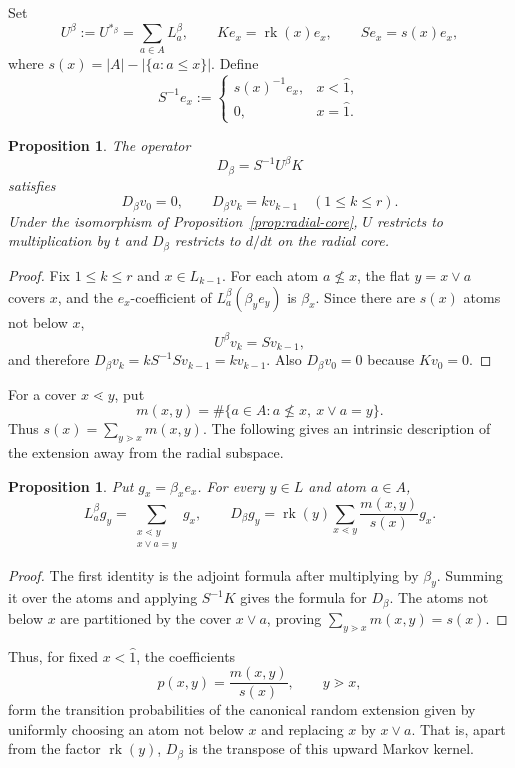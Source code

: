 \documentclass[11pt]{amsart}
\newtheorem{prop}[thm]{Proposition}
\theoremstyle{definition}
\theoremstyle{remark}
\DeclareMathOperator{\rk}{rk}
\newcommand{\ab}[1]{\left| #1 \right|}
\begin{document}
Set
\[
U^\beta:=U^{*_{\beta}}=\sum_{a\in A}L_a^\beta,
\qquad
Ke_x=\rk(x)e_x,
\qquad
Se_x=s(x)e_x,
\]
where $s(x)=\ab{A}-\ab{\{a:a\le x\}}$. Define 
\[
S^{-1}e_x:=\begin{cases}
s(x)^{-1}e_x,&x<\hat 1,\\
0,&x=\hat 1.
\end{cases}
\]

\begin{prop}\label{prop:D}
The operator
\[
D_\beta=S^{-1}U^\beta K
\]
satisfies
\[
D_\beta v_0=0,\qquad D_\beta v_k=kv_{k-1}\quad(1\le k\le r).
\]
Under the isomorphism of Proposition~\ref{prop:radial-core}, $U$ restricts to multiplication by $t$ and $D_\beta$ restricts to $d/dt$ on the radial core.
\end{prop}

\begin{proof}
Fix $1\le k\le r$ and $x\in L_{k-1}$. For each atom $a\nleq x$, the flat $y=x\vee a$ covers $x$, and the $e_x$-coefficient of $L_a^\beta(\beta_y e_y)$ is $\beta_x$. Since there are $s(x)$ atoms not below $x$,
\[
U^\beta v_k=Sv_{k-1},
\]
and therefore $D_\beta v_k=kS^{-1}Sv_{k-1}=kv_{k-1}$. Also $D_\beta v_0=0$ because $Kv_0=0$.
\end{proof}

For a cover $x\lessdot y$, put
\[
m(x,y)=\#\{a\in A:a\nleq x,\ x\vee a=y\}.
\]
Thus $s(x)=\sum_{y\gtrdot x}m(x,y)$.  The following gives an intrinsic description of the extension away from the radial subspace.

\begin{prop}\label{prop:naturality}
Put $g_x=\beta_xe_x$.  For every $y\in L$ and atom $a\in A$,
\begin{equation}\label{eq:rescaled}
L_a^\beta g_y=
\sum_{\substack{x\lessdot y\\x\vee a=y}}g_x,
\qquad
D_\beta g_y
=\rk(y)\sum_{x\lessdot y}\frac{m(x,y)}{s(x)}g_x.
\end{equation}
\end{prop}

\begin{proof}
The first identity is the adjoint formula after multiplying by $\beta_y$.  Summing it over the atoms and applying $S^{-1}K$ gives the formula for $D_\beta$.  The atoms not below $x$ are partitioned by the cover $x\vee a$, proving
$\sum_{y\gtrdot x}m(x,y)=s(x)$. \qedhere
\end{proof}

Thus, for fixed $x<\hat 1$, the coefficients
\[
p(x,y)=\frac{m(x,y)}{s(x)},\qquad y\gtrdot x,
\]
form the transition probabilities of the canonical random extension given by uniformly choosing an atom not below $x$ and replacing $x$ by $x\vee a$.  That is, apart from the factor $\rk(y)$, $D_\beta$ is the transpose of this upward Markov kernel.
\end{document}
